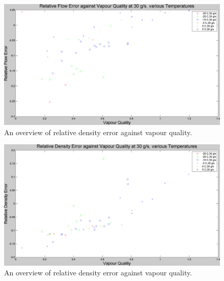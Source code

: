 \documentclass{report}
\begin{document}
\begin{figure}
\includegraphics[width=\textwidth]{plots/fig7}
\caption{An overview of relative density error against vapour quality.}
\label{plot:7}
\end{figure}

\begin{figure}
\includegraphics[width=\textwidth]{plots/fig8}
\caption{An overview of relative density error against vapour quality.}
\label{plot:8}
\end{figure}
\end{document}
